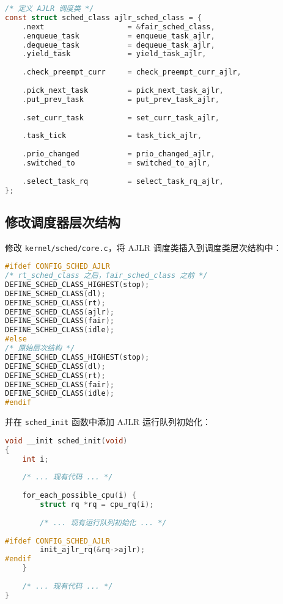 \documentclass[a4paper,12pt]{article}
\begin{document}
\begin{lstlisting}[language=C]
/* 定义 AJLR 调度类 */
const struct sched_class ajlr_sched_class = {
    .next                   = &fair_sched_class,
    .enqueue_task           = enqueue_task_ajlr,
    .dequeue_task           = dequeue_task_ajlr,
    .yield_task             = yield_task_ajlr,
    
    .check_preempt_curr     = check_preempt_curr_ajlr,
    
    .pick_next_task         = pick_next_task_ajlr,
    .put_prev_task          = put_prev_task_ajlr,
    
    .set_curr_task          = set_curr_task_ajlr,
    
    .task_tick              = task_tick_ajlr,
    
    .prio_changed           = prio_changed_ajlr,
    .switched_to            = switched_to_ajlr,
    
    .select_task_rq         = select_task_rq_ajlr,
};
\end{lstlisting}

\subsection{修改调度器层次结构}

修改 \texttt{kernel/sched/core.c}，将 AJLR 调度类插入到调度类层次结构中：

\begin{lstlisting}[language=C]
#ifdef CONFIG_SCHED_AJLR
/* rt_sched_class 之后，fair_sched_class 之前 */
DEFINE_SCHED_CLASS_HIGHEST(stop);
DEFINE_SCHED_CLASS(dl);
DEFINE_SCHED_CLASS(rt);
DEFINE_SCHED_CLASS(ajlr);
DEFINE_SCHED_CLASS(fair);
DEFINE_SCHED_CLASS(idle);
#else
/* 原始层次结构 */
DEFINE_SCHED_CLASS_HIGHEST(stop);
DEFINE_SCHED_CLASS(dl);
DEFINE_SCHED_CLASS(rt);
DEFINE_SCHED_CLASS(fair);
DEFINE_SCHED_CLASS(idle);
#endif
\end{lstlisting}

并在 \texttt{sched\_init} 函数中添加 AJLR 运行队列初始化：

\begin{lstlisting}[language=C]
void __init sched_init(void)
{
    int i;
    
    /* ... 现有代码 ... */
    
    for_each_possible_cpu(i) {
        struct rq *rq = cpu_rq(i);
        
        /* ... 现有运行队列初始化 ... */
        
#ifdef CONFIG_SCHED_AJLR
        init_ajlr_rq(&rq->ajlr);
#endif
    }
    
    /* ... 现有代码 ... */
}
\end{lstlisting}
\end{document}
